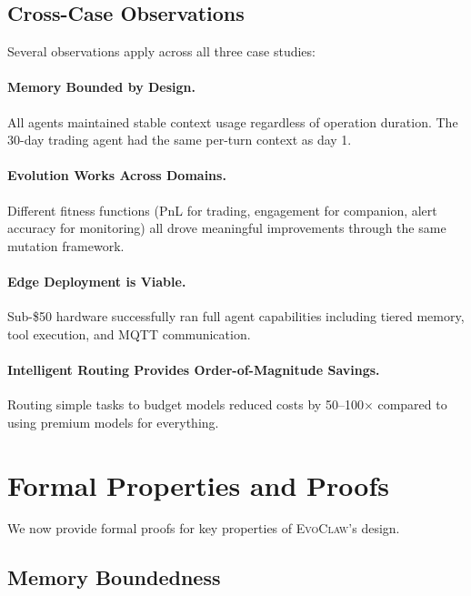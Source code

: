 \documentclass{article}
\newcommand{\evoclaw}{\textsc{EvoClaw}}
\begin{document}
\subsection{Cross-Case Observations}

Several observations apply across all three case studies:

\paragraph{Memory Bounded by Design.} All agents maintained stable context usage regardless of operation duration. The 30-day trading agent had the same per-turn context as day 1.

\paragraph{Evolution Works Across Domains.} Different fitness functions (PnL for trading, engagement for companion, alert accuracy for monitoring) all drove meaningful improvements through the same mutation framework.

\paragraph{Edge Deployment is Viable.} Sub-\$50 hardware successfully ran full agent capabilities including tiered memory, tool execution, and MQTT communication.

\paragraph{Intelligent Routing Provides Order-of-Magnitude Savings.} Routing simple tasks to budget models reduced costs by 50--100$\times$ compared to using premium models for everything.



\section{Formal Properties and Proofs}
\label{sec:proofs}

We now provide formal proofs for key properties of \evoclaw{}'s design.

\subsection{Memory Boundedness}
\end{document}
